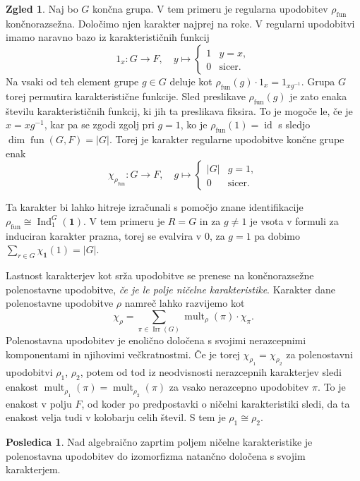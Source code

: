\documentclass[11pt]{book}
\def\11{\mathbf{1}}
\DeclareMathOperator\Ind{Ind}
\DeclareMathOperator\mult{mult}
\DeclareMathOperator\Irr{Irr}
\DeclareMathOperator\fun{fun}
\DeclareMathOperator\id{id}
\theoremstyle{definition}
\theoremstyle{zgled}
\newtheorem*{zgled}{Zgled}
\theoremstyle{odprtproblem}
\theoremstyle{domacanaloga}
\theoremstyle{izrek}
\newtheorem*{posledica}{Posledica}
\begin{document}
\begin{zgled}
    Naj bo $G$ končna grupa. V tem primeru je regularna upodobitev $\rho_{\fun}$ končnorazsežna. Določimo njen karakter najprej na roke. V regularni upodobitvi imamo naravno bazo iz karakterističnih funkcij
    \[
        1_{x} \colon G \to F, \quad
        y \mapsto \begin{cases} 1 & y = x, \\ 0 & \text{sicer.} \end{cases}
    \]
    Na vsaki od teh element grupe $g \in G$ deluje kot $\rho_{\fun}(g) \cdot 1_x = 1_{x g^{-1}}$. Grupa $G$ torej permutira karakteristične funkcije. Sled preslikave $\rho_{\fun}(g)$ je zato enaka številu karakterističnih funkcij, ki jih ta preslikava fiksira. To je mogoče le, če je $x = x g^{-1}$, kar pa se zgodi zgolj pri $g = 1$, ko je $\rho_{\fun}(1) = \id$ s sledjo $\dim \fun(G,F) = |G|$. Torej je karakter regularne upodobitve končne grupe enak
    \[
        \chi_{\rho_{\fun}} \colon G \to F, \quad
        g \mapsto \begin{cases} |G| & g = 1, \\ 0 & \text{sicer.} \end{cases}
    \]
    
    Ta karakter bi lahko hitreje izračunali s pomočjo znane identifikacije $\rho_{\fun} \cong \Ind^G_1(\11)$. V tem primeru je $R = G$ in za $g \neq 1$ je vsota v formuli za induciran karakter prazna, torej se evalvira v $0$, za $g = 1$ pa dobimo $\sum_{r \in G} \chi_{\11}(1) = |G|$.
\end{zgled}

Lastnost karakterjev kot srža upodobitve se prenese na končnorazsežne polenostavne upodobitve, \emph{če je le polje ničelne karakteristike}. Karakter dane polenostavne upodobitve $\rho$ namreč lahko razvijemo kot
\[
    \textstyle \chi_{\rho} = \sum_{\pi \in \Irr(G)} \mult_{\rho}(\pi) \cdot \chi_{\pi}.
\]
Polenostavna upodobitev je enolično določena s svojimi nerazcepnimi komponentami in njihovimi večkratnostmi. Če je torej $\chi_{\rho_1} = \chi_{\rho_2}$ za polenostavni upodobitvi $\rho_1$, $\rho_2$, potem od tod iz neodvisnosti nerazcepnih karakterjev sledi enakost $\mult_{\rho_1}(\pi) = \mult_{\rho_2}(\pi)$ za vsako nerazcepno upodobitev $\pi$. To je enakost v polju $F$, od koder po predpostavki o ničelni karakteristiki sledi, da ta enakost velja tudi v kolobarju celih števil. S tem je $\rho_1 \cong \rho_2$.

\begin{posledica}
Nad algebraično zaprtim poljem ničelne karakteristike je polenostavna upodobitev do izomorfizma natančno določena s svojim karakterjem.
\end{posledica}
\end{document}

